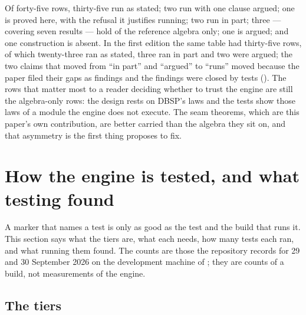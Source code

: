 \documentclass[11pt,a4paper]{article}
\renewcommand{\_}{\oldunderscore\allowbreak}
\begin{document}
Of forty-five rows, thirty-five run as stated; two run with one clause argued; one is proved here,
with the refusal it justifies running; two run in part; three --- covering seven results --- hold of the
reference algebra only; one is argued; and one construction is absent. In the first edition the same
table had thirty-five rows, of which twenty-three ran as stated, three ran in part and two were argued;
the two claims that moved from ``in part'' and ``argued'' to ``runs'' moved because the paper filed their
gaps as findings and the findings were closed by tests (). The rows that matter most
to a reader deciding whether to trust the engine are still the algebra-only rows: the design rests on
DBSP's laws and the tests show those laws of a module the engine does not execute. The seam theorems,
which are this paper's own contribution, are better carried than the algebra they sit on, and that
asymmetry is the first thing  proposes to fix.

\section{How the engine is tested, and what testing found}\label{sec:testing}

A marker that names a test is only as good as the test and the build that runs it. This section says
what the tiers are, what each needs, how many tests each ran, and what running them found. The counts
are those the repository records for 29 and 30 September 2026 on the development machine of
; they are counts of a build, not measurements of the engine.

\subsection{The tiers}
\end{document}
